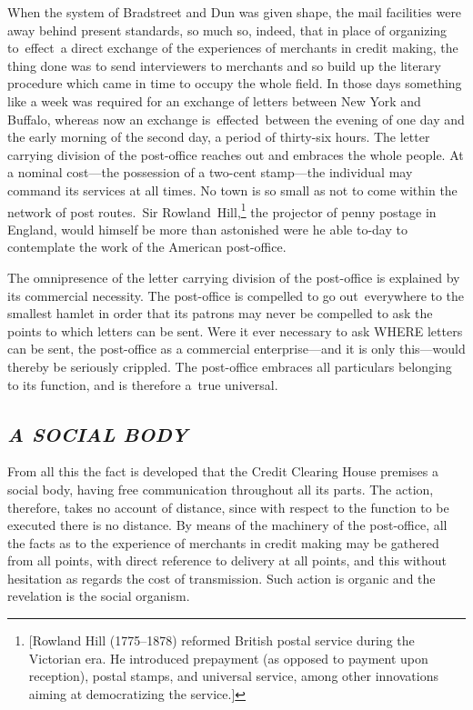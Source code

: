 \documentclass[twoside,symmetric,nobib,justified]{tufte-book}
\begin{document}
When the system of Bradstreet and Dun was given shape, the mail
facilities were away behind present standards, so much so, indeed, that
in place of organizing to~effect~a direct exchange of the experiences of
merchants in credit making, the thing done was to send interviewers to
merchants and so build up the literary procedure which came in time to
occupy the whole field. In those days something like a week was required
for an exchange of letters between New York and Buffalo, whereas now an
exchange is~effected~between the evening of one day and the early
morning of the second day, a period of thirty-six hours. The letter
carrying division of the post-office reaches out and embraces the whole
people. At a nominal cost---the possession of a two-cent stamp---the
individual may command its services at all times. No town is so small as
not to come within the network of post routes.~Sir
Rowland~Hill,\footnote{{[}Rowland Hill (1775--1878) reformed British
  postal service during the Victorian era. He introduced prepayment (as
  opposed to payment upon reception), postal stamps, and universal
  service, among other innovations aiming at democratizing the
  service.{]}} the projector of penny postage in England, would himself
be more than astonished were he able to-day to contemplate the work of
the American post-office.~

The omnipresence of the letter carrying division of the post-office is
explained by its commercial necessity. The post-office is compelled to
go out~everywhere to the smallest hamlet in order that its patrons may
never be compelled to ask the points to which letters can be sent. Were
it ever necessary to ask WHERE letters can be sent, the post-office as a
commercial enterprise---and it is only this---would thereby be seriously
crippled. The post-office embraces all particulars belonging to its
function, and is therefore a~true universal.~

\hypertarget{a-social-body}{%
\subsection{\texorpdfstring{\emph{A SOCIAL
BODY}}{A SOCIAL BODY}}\label{a-social-body}}

From all this the fact is developed that the Credit Clearing House
premises a social body, having free communication throughout all its
parts. The action, therefore, takes no account of distance, since with
respect to the function to be executed there is no distance. By means of
the machinery of the post-office, all the facts as to the experience of
merchants in credit making may be gathered from all points, with direct
reference to delivery at all points, and this without hesitation as
regards the cost of transmission. Such action is organic and the
revelation is the social organism.~
\end{document}
